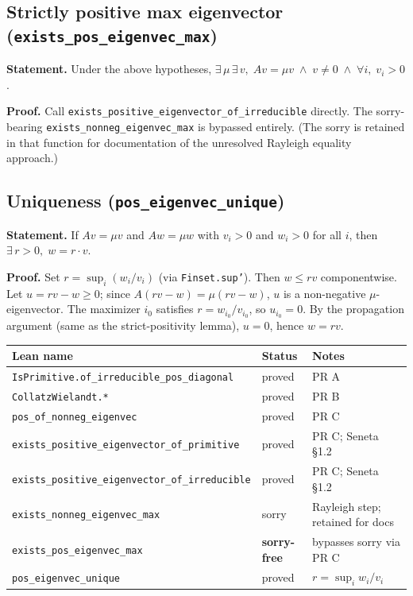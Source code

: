 \documentclass[a4paper,11pt]{article}
\begin{document}
\subsection{Strictly positive max eigenvector (\texttt{exists\_pos\_eigenvec\_max})}

\textbf{Statement.}
Under the above hypotheses,
$\exists\,\mu\,\exists\,v,\; Av = \mu v \;\land\; v \neq 0 \;\land\; \forall i,\; v_i > 0$.

\textbf{Proof.}
Call \texttt{exists\_positive\_eigenvector\_of\_irreducible} directly.
The sorry-bearing \texttt{exists\_nonneg\_eigenvec\_max} is bypassed entirely.
(The sorry is retained in that function for documentation of the unresolved
Rayleigh equality approach.)

\subsection{Uniqueness (\texttt{pos\_eigenvec\_unique})}

\textbf{Statement.}
If $Av = \mu v$ and $Aw = \mu w$ with $v_i > 0$ and $w_i > 0$ for all $i$,
then $\exists\, r > 0,\; w = r\cdot v$.

\textbf{Proof.}
Set $r = \sup_i(w_i/v_i)$ (via \texttt{Finset.sup'}).
Then $w \leq rv$ componentwise.
Let $u = rv - w \geq 0$; since $A(rv-w) = \mu(rv-w)$, $u$ is a non-negative
$\mu$-eigenvector.
The maximizer $i_0$ satisfies $r = w_{i_0}/v_{i_0}$, so $u_{i_0} = 0$.
By the propagation argument (same as the strict-positivity lemma), $u = 0$, hence $w = rv$.

\begin{center}
\begin{tabular}{lll}
\hline
Lean name & Status & Notes \\
\hline
\texttt{IsPrimitive.of\_irreducible\_pos\_diagonal} & proved & PR A \\
\texttt{CollatzWielandt.*} & proved & PR B \\
\texttt{pos\_of\_nonneg\_eigenvec} & proved & PR C \\
\texttt{exists\_positive\_eigenvector\_of\_primitive} & proved & PR C; Seneta \S1.2 \\
\texttt{exists\_positive\_eigenvector\_of\_irreducible} & proved & PR C; Seneta \S1.2 \\
\texttt{exists\_nonneg\_eigenvec\_max} & sorry & Rayleigh step; retained for docs \\
\texttt{exists\_pos\_eigenvec\_max} & \textbf{sorry-free} & bypasses sorry via PR C \\
\texttt{pos\_eigenvec\_unique} & proved & $r = \sup_i w_i/v_i$ \\
\hline
\end{tabular}
\end{center}
\end{document}

